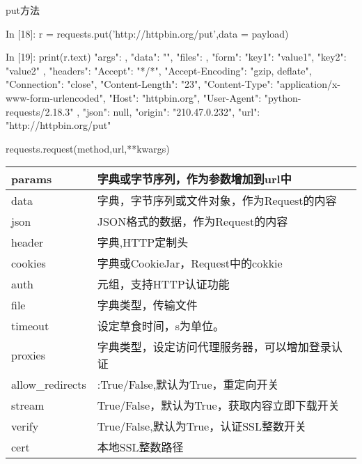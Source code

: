 put方法
\begin{python}
In [18]: r = requests.put('http://httpbin.org/put',data = payload)

In [19]: print(r.text)
{
  "args": {}, 
  "data": "", 
  "files": {}, 
  "form": {
    "key1": "value1", 
    "key2": "value2"
  }, 
  "headers": {
    "Accept": "*/*", 
    "Accept-Encoding": "gzip, deflate", 
    "Connection": "close", 
    "Content-Length": "23", 
    "Content-Type": "application/x-www-form-urlencoded", 
    "Host": "httpbin.org", 
    "User-Agent": "python-requests/2.18.3"
  }, 
  "json": null, 
  "origin": "210.47.0.232", 
  "url": "http://httpbin.org/put"
}
\end{python}
requests.request(method,url,**kwargs)\newline
{}
\begin{center}
\begin{tabular}{|p{3cm}|p{12cm}|}
\hline
params&字典或字节序列，作为参数增加到url中\\
\hline
data&字典，字节序列或文件对象，作为Request的内容\\
\hline
json&JSON格式的数据，作为Request的内容\\
\hline
header&字典,HTTP定制头\\
\hline
cookies&字典或CookieJar，Request中的cokkie\\
\hline
auth&元组，支持HTTP认证功能\\
\hline
file&字典类型，传输文件\\
\hline
timeout&设定草食时间，s为单位。\\
\hline
proxies&字典类型，设定访问代理服务器，可以增加登录认证\\
\hline
allow\_redirects&:True/False,默认为True，重定向开关\\
\hline
stream&True/False，默认为True，获取内容立即下载开关\\
\hline
verify&True/False,默认为True，认证SSL整数开关\\
\hline
cert&本地SSL整数路径\\
\hline
\end{tabular}
\end{center}
